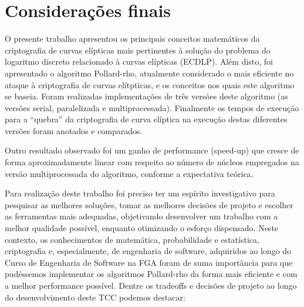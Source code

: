 \chapter{Considerações finais}
O presente trabalho apresentou os principais conceitos matemáticos da criptografia de curvas elípticas mais pertinentes à solução do problema do logaritmo discreto relacionado à curvas elípticas (ECDLP). Além disto, foi apresentado o algoritmo Pollard-rho, atualmente considerado o mais eficiente no ataque à criptografia de curvas elítpticas, e os conceitos nos quais este algoritmo se baseia. Foram realizadas implementações de três versões deste algoritmo (as versões serial, paralelizada e multiprocessada).
Finalmente os tempos de execução para a ``quebra'' da criptografia de curva elíptica na execução destas diferentes versões foram anotados e comparados.


Outro resultado observado foi um ganho de performance (speed-up) que cresce de forma aproximadamente linear com respeito ao número de núcleos empregados na versão multiprocessada do algoritmo, conforme a expectativa teórica.

Para realização deste trabalho foi preciso ter um espírito investigativo para pesquisar as melhores soluções, tomar as melhores decisões de projeto e escolher as ferramentas mais adequadas, objetivando desenvolver um trabalho com a melhor qualidade possível, enquanto otimizando o esforço dispensado. Neste contexto, os conhecimentos de matemática, probabilidade e estatística, criptografia e, especialmente, de engenharia de software, adquiridos ao longo do Curso de Engenharia de Software na FGA foram de suma importância para que pudéssemos implementar os algoritmos Pollard-rho da forma mais eficiente e com a melhor performance possível. Dentre os tradeoffs e decisões de projeto ao longo do desenvolvimento deste TCC podemos destacar:


